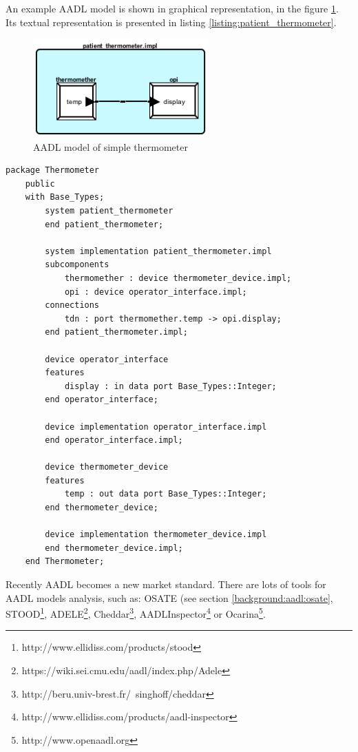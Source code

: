 An example AADL model is shown in graphical representation, in the figure \ref{figure:patient_thermometer}. Its textual representation is presented in listing \ref{listing:patient_thermometer}.

\begin{figure}[ht]%
    \begin{center}
    	\includegraphics[width=0.6\textwidth]{figures/patient_thermometer.png}    	
    \end{center}
    \caption{AADL model of simple thermometer}
    \label{figure:patient_thermometer}
\end{figure}

\singlespacing
\begin{lstlisting}[language=aadl, frame=single, gobble=0, caption={AADL model of simple thermometer}]
	package Thermometer
	public
	with Base_Types;
		system patient_thermometer
		end patient_thermometer;

		system implementation patient_thermometer.impl
		subcomponents
			thermomether : device thermometer_device.impl;
			opi : device operator_interface.impl;
		connections
			tdn : port thermomether.temp -> opi.display;
		end patient_thermometer.impl;

		device operator_interface
		features
			display : in data port Base_Types::Integer;
		end operator_interface;

		device implementation operator_interface.impl
		end operator_interface.impl;

		device thermometer_device
		features
			temp : out data port Base_Types::Integer;
		end thermometer_device;

		device implementation thermometer_device.impl
		end thermometer_device.impl;
	end Thermometer;
\end{lstlisting} 
\label{listing:patient_thermometer}
\doublespacing

Recently AADL becomes a new market standard. There are lots of tools for AADL models analysis, such as: OSATE (see section \ref{background:aadl:osate}, STOOD\footnote{http://www.ellidiss.com/products/stood}, ADELE\footnote{https://wiki.sei.cmu.edu/aadl/index.php/Adele}, Cheddar\footnote{http://beru.univ-brest.fr/~singhoff/cheddar}, AADLInspector\footnote{http://www.ellidiss.com/products/aadl-inspector} or Ocarina\footnote{http://www.openaadl.org}.

